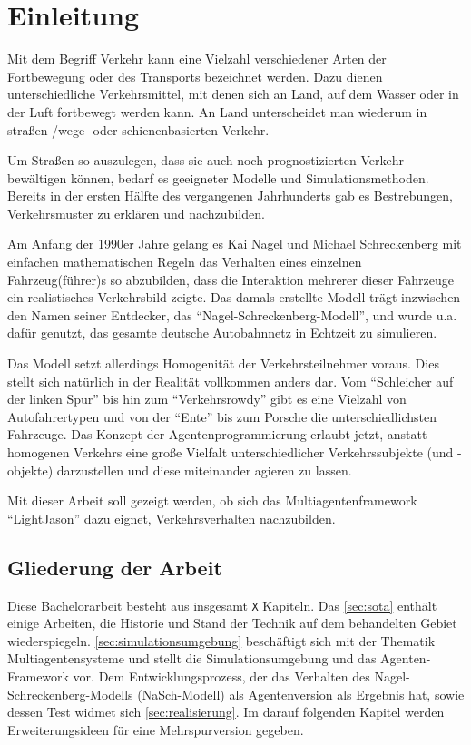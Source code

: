 \section{Einleitung}
\label{sec:einleitung}

Mit dem Begriff Verkehr kann eine Vielzahl verschiedener Arten der Fortbewegung oder des Transports bezeichnet werden. 
Dazu dienen unterschiedliche Verkehrsmittel, mit denen sich an Land, auf dem Wasser oder in der Luft fortbewegt werden kann.
An Land unterscheidet man wiederum in \mbox{straßen-/}wege- oder schienenbasierten Verkehr.

Um Straßen so auszulegen, dass sie auch noch prognostizierten Verkehr bewältigen können, bedarf es geeigneter Modelle und Simulationsmethoden.
Bereits in der ersten Hälfte des  vergangenen Jahrhunderts gab es Bestrebungen, Verkehrsmuster zu erklären und nachzubilden.

Am Anfang der 1990er Jahre gelang es Kai Nagel und Michael Schreckenberg mit einfachen mathematischen Regeln das Verhalten eines einzelnen Fahrzeug(führer)s so abzubilden, dass die Interaktion mehrerer dieser Fahrzeuge ein realistisches Verkehrsbild zeigte.
Das damals erstellte Modell trägt inzwischen den Namen seiner Entdecker, das \enquote{Nagel-Schreckenberg-Modell}, und wurde u.a. dafür genutzt, das gesamte deutsche Autobahnnetz in Echtzeit zu simulieren.

Das Modell setzt allerdings Homogenität der Verkehrsteilnehmer voraus. 
Dies stellt sich natürlich in der Realität vollkommen anders dar.
Vom \enquote{Schleicher auf der linken Spur} bis hin zum \enquote{Verkehrsrowdy} gibt es eine Vielzahl von Autofahrertypen und von der \enquote{Ente} bis zum Porsche die unterschiedlichsten Fahrzeuge.
Das Konzept der Agentenprogrammierung erlaubt jetzt, anstatt homogenen Verkehrs eine große Vielfalt unterschiedlicher Verkehrssubjekte (und -objekte) darzustellen und diese miteinander agieren zu lassen.

Mit dieser Arbeit soll gezeigt werden, ob sich das Multiagentenframework \enquote{LightJason} dazu eignet, Verkehrsverhalten nachzubilden.



\subsection{Gliederung der Arbeit}
\label{sec:gliederung}

Diese Bachelorarbeit besteht aus insgesamt \texttt{X} Kapiteln.
Das \cref{sec:sota} enthält einige Arbeiten, die Historie und Stand der Technik auf dem behandelten Gebiet wiederspiegeln.
\cref{sec:simulationsumgebung} beschäftigt sich mit der Thematik Multiagentensysteme und stellt die Simulationsumgebung und das Agenten-Framework vor.
Dem Entwicklungsprozess, der das Verhalten des Nagel-Schreckenberg-Modells (NaSch-Modell) als Agentenversion als Ergebnis hat, sowie dessen Test widmet sich \cref{sec:realisierung}.
Im darauf folgenden Kapitel werden Erweiterungsideen für eine Mehrspurversion gegeben.

